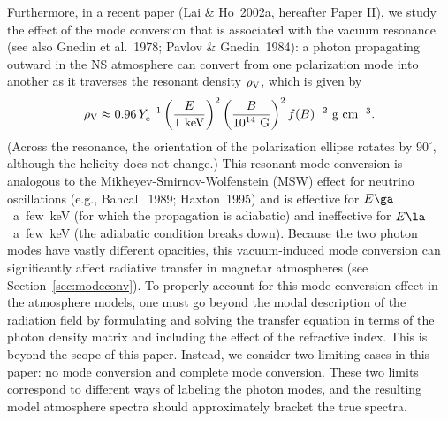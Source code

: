 \documentclass{mn2e}
\newcommand{\be}{\begin{equation}}
\newcommand{\ee}{\end{equation}}
\newcommand{\lp}{\left(}
\newcommand{\rp}{\right)}
\newcommand{\etal}{et al.}
\newcommand{\Ye}{Y_{\rm e}}
\newcommand{\densvp}{\rho_{\rm V}}
\newcommand{\laiho}{Paper II}
\begin{document}
Furthermore, in a recent paper (Lai \& Ho~2002a, hereafter \laiho),
we study the effect of the mode conversion that is associated
with the vacuum resonance (see also Gnedin \etal~1978; Pavlov \&
Gnedin~1984): a photon propagating outward in the NS atmosphere can convert
from one polarization mode into another as it traverses the resonant
density $\densvp$, which is given by
\be
\densvp \approx 0.96\,\Ye^{-1}\lp\frac{E}{\mbox{1 keV}}\rp^2
 \lp\frac{B}{\mbox{10$^{14}$ G}}\rp^2f(B)^{-2}\mbox{ g cm$^{-3}$}.
\ee
(Across the resonance, the orientation of the polarization ellipse
rotates by $90^\circ$, although the helicity does not change.)
This resonant mode conversion is analogous to the
Mikheyev-Smirnov-Wolfenstein (MSW) effect for neutrino oscillations
(e.g., Bahcall~1989; Haxton~1995) and is effective
for $E\ga$~a~few~keV (for which the propagation is adiabatic) and
ineffective for $E\la$~a~few~keV (the adiabatic condition breaks down).
Because the two photon modes have vastly different opacities,
this vacuum-induced mode conversion can significantly affect
radiative transfer in magnetar atmospheres (see Section~\ref{sec:modeconv}).
To properly account for this mode conversion effect in the atmosphere
models, one must go beyond the modal description of the radiation
field by formulating and solving the transfer equation in terms of the
photon density matrix and including the effect of the refractive
index.  This is beyond the scope of this paper.  Instead, we consider
two limiting cases in this paper: no mode conversion and complete
mode conversion.  These two limits correspond to different
ways of labeling the photon modes, and the resulting model
atmosphere spectra should approximately bracket the true spectra.
\end{document}
